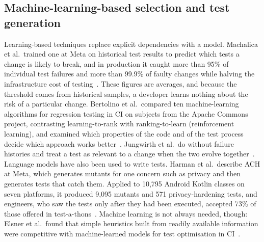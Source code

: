 \documentclass[11pt]{article}
\begin{document}
\subsection*{Machine-learning-based selection and test generation}
Learning-based techniques replace explicit dependencies with a model. Machalica et al.\ trained one at Meta on historical test results to predict which tests a change is likely to break, and in production it caught more than 95\% of individual test failures and more than 99.9\% of faulty changes while halving the infrastructure cost of testing~\cite{machalica2019pts}. These figures are averages, and because the threshold comes from historical samples, a developer learns nothing about the risk of a particular change. Bertolino et al.\ compared ten machine-learning algorithms for regression testing in CI on subjects from the Apache Commons project, contrasting learning-to-rank with ranking-to-learn (reinforcement learning), and examined which properties of the code and of the test process decide which approach works better~\cite{bertolino2020learning}. Jungwirth et al.\ do without failure histories and treat a test as relevant to a change when the two evolve together~\cite{jungwirth2026pto}. Language models have also been used to write tests. Harman et al.\ describe ACH at Meta, which generates mutants for one concern such as privacy and then generates tests that catch them. Applied to 10,795 Android Kotlin classes on seven platforms, it produced 9,095 mutants and 571 privacy-hardening tests, and engineers, who saw the tests only after they had been executed, accepted 73\% of those offered in test-a-thons~\cite{foster2025ach}. Machine learning is not always needed, though: Elsner et al.\ found that simple heuristics built from readily available information were competitive with machine-learned models for test optimisation in CI~\cite{elsner2021readily}.
\end{document}
